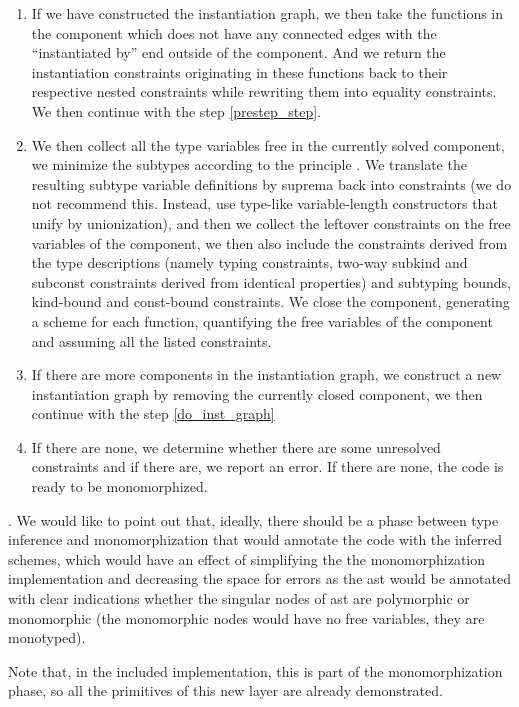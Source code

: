 \begin{defn}
\begin{enumerate}
        \item If we have constructed the instantiation graph, we then take the functions in the component which does not have any connected edges with the ``instantiated by'' end outside of the component. And we return the instantiation constraints originating in these functions back to their respective nested constraints while rewriting them into equality constraints. We then continue with the step \ref{prestep_step}. \label{do_inst_graph}

        \item We then collect all the type variables free in the currently solved component, we minimize the subtypes according to the principle . We translate the resulting subtype variable definitions by suprema back into constraints (we do not recommend this. Instead, use type-like variable-length constructors that unify by unionization), and then we collect the leftover constraints on the free variables of the component, we then also include the constraints derived from the type descriptions (namely typing constraints, two-way subkind and subconst constraints derived from identical properties) and subtyping bounds, kind-bound and const-bound constraints. We close the component, generating a scheme for each function, quantifying the free variables of the component and assuming all the listed constraints.

        \item If there are more components in the instantiation graph, we construct a new instantiation graph by removing the currently closed component, we then continue with the step \ref{do_inst_graph}

        \item If there are none, we determine whether there are some unresolved constraints and if there are, we report an error. If there are none, the code is ready to be monomorphized.
    \end{enumerate}

    . We would like to point out that, ideally, there should be a phase between type inference and monomorphization that would annotate the code with the inferred schemes, which would have an effect of simplifying the the monomorphization implementation and decreasing the space for errors as the ast would be annotated with clear indications whether the singular nodes of ast are polymorphic or monomorphic (the monomorphic nodes would have no free variables, they are monotyped).

    Note that, in the included implementation, this is part of the monomorphization phase, so all the primitives of this new layer are already demonstrated.
\end{defn}

